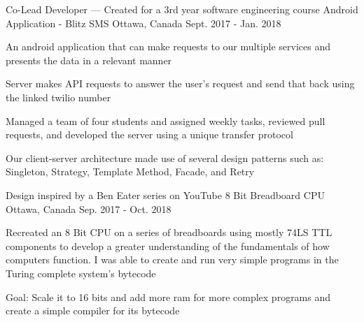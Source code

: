 
\begin{cventries}

  \cventry
    {Co-Lead Developer --- Created for a 3rd year software engineering course} %
    {Android Application - Blitz SMS} %
    {Ottawa, Canada} %
    {Sept. 2017 - Jan. 2018} %
    {
      \begin{cvitems} %
        \item An android application that can make requests to our multiple services and presents the data in a relevant manner
        \item Server makes API requests to answer the user's request and send that back using the linked twilio number
        \item Managed a team of four students and assigned weekly tasks, reviewed pull requests, and developed the server using a unique transfer protocol
        \item Our client-server architecture made use of several design patterns such as: Singleton, Strategy, Template Method, Facade, and Retry
      \end{cvitems}
    }

  \cventry
    {Design inspired by a Ben Eater series on YouTube} %
    {8 Bit Breadboard CPU} %
    {Ottawa, Canada} %
    {Sep. 2017 - Oct. 2018} %
    {
      \begin{cvitems} %
        \item Recreated an 8 Bit CPU on a series of breadboards using mostly 74LS TTL components to develop a greater understanding of the fundamentals of how computers function. I was able to create and run very simple programs in the Turing complete system's bytecode
        \item Goal: Scale it to 16 bits and add more ram for more complex programs and create a simple compiler for its bytecode
      \end{cvitems}
    }

\end{cventries}
